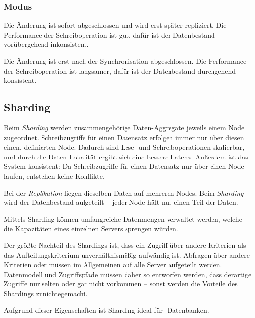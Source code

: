 \subsubsection{Modus}
\begin{infobox}
  Die Änderung ist sofort abgeschlossen und wird erst später repliziert. Die Performance der Schreiboperation ist gut, dafür ist der Datenbestand vorübergehend inkonsistent.
\end{infobox}
\begin{infobox}
  Die Änderung ist erst nach der Synchronisation abgeschlossen. Die Performance der Schreiboperation ist langsamer, dafür ist der Datenbestand durchgehend konsistent.
\end{infobox}

\subsection{Sharding}
Beim \emph{Sharding} werden zusammengehörige Daten-Aggregate jeweils einem Node zugeordnet. Schreibzugriffe für einen Datensatz erfolgen immer nur über diesen einen, definierten Node. Dadurch sind Lese- und Schreiboperationen skalierbar, und durch die Daten-Lokalität ergibt sich eine bessere Latenz. Außerdem ist das System konsistent: Da Schreibzugriffe für einen Datensatz nur über einen Node laufen, entstehen keine Konflikte.

\begin{merksatz}
Bei der \emph{Replikation} liegen dieselben Daten auf mehreren Nodes. Beim \emph{Sharding} wird der Datenbestand aufgeteilt -- jeder Node hält nur einen Teil der Daten.
\end{merksatz}

Mittels Sharding können umfangreiche Datenmengen verwaltet werden, welche die Kapazitäten eines einzelnen Servers sprengen würden.

\begin{warnbox}[Nachteil]
Der größte Nachteil des Shardings ist, dass ein Zugriff über andere Kriterien als das Aufteilungskriterium unverhältnismäßig aufwändig ist. Abfragen über andere Kriterien oder  müssen im Allgemeinen auf alle Server aufgeteilt werden. Datenmodell und Zugriffspfade müssen daher so entworfen werden, dass derartige Zugriffe nur selten oder gar nicht vorkommen -- sonst werden die Vorteile des Shardings zunichtegemacht.
\end{warnbox}

Aufgrund dieser Eigenschaften ist Sharding ideal für -Datenbanken.

